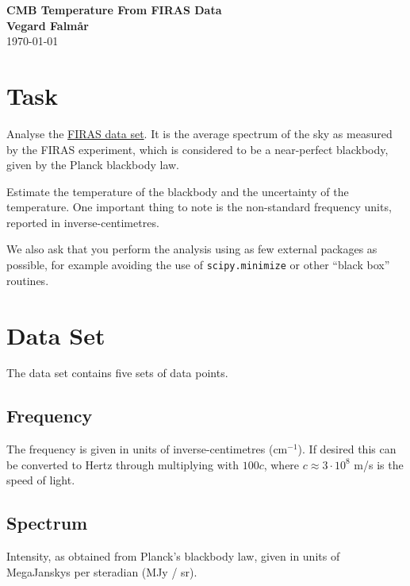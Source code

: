 \documentclass[a4paper,onecolumn,12pt]{revtex4-1}
\begin{document}
\begin{center}
{\bf \Large CMB Temperature From FIRAS Data\\}
{\bf Vegard Falmår\\}
\today
\end{center}





\section{Task}

Analyse the
\href{https://lambda.gsfc.nasa.gov/data/cobe/firas/monopole_spec/firas_monopole_spec_v1.txt}{FIRAS data set}.
It is the average spectrum of the sky as measured by the FIRAS experiment, which is considered to be a near-perfect blackbody, given by the Planck blackbody law.

Estimate the temperature of the blackbody and the uncertainty of the temperature. One important thing to note is the non-standard frequency units, reported in inverse-centimetres.

We also ask that you perform the analysis using as few external packages as possible, for example avoiding the use of \texttt{scipy.minimize} or other
``black box'' routines.





\section{Data Set}

The data set contains five sets of data points.

\subsection{Frequency}

The frequency is given in units of inverse-centimetres (cm\(^{-1}\)). If desired this can be converted to Hertz through multiplying with \(100 c\), where \(c \approx 3 \cdot 10^8\) m/s is the speed of light.



\subsection{Spectrum}

Intensity, as obtained from Planck's blackbody law, given in units of MegaJanskys per steradian (MJy / sr).
\end{document}
